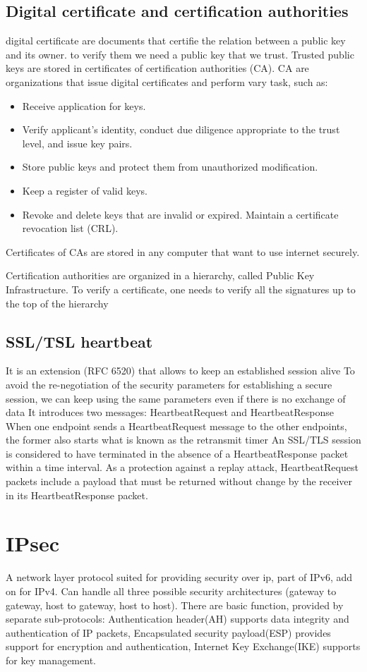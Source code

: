 \subsection{Digital certificate and certification authorities}
digital certificate are documents that certifie the relation between a public
key and its owner. to verify them we need a public key that we trust. 
Trusted public keys are stored in certificates of certification authorities (CA).
CA are organizations that issue digital certificates and perform vary task, such as:
\begin{itemize}
    \item Receive application for keys.
    \item Verify applicant’s identity, conduct due diligence appropriate to the trust level,
and issue key pairs.
    \item Store public keys and protect them from unauthorized modification.
    \item Keep a register of valid keys.
    \item Revoke and delete keys that are invalid or expired. Maintain a certificate
revocation list (CRL).

\end{itemize}
Certificates of CAs are stored in any computer that want to use internet
securely.

Certification authorities are
organized in a hierarchy, called
Public Key Infrastructure. To verify a certificate, one needs
to verify all the signatures up to
the top of the hierarchy

\subsection{SSL/TSL heartbeat}
It is an extension (RFC 6520) that allows to keep an established session
alive
To avoid the re-negotiation of the security parameters for establishing a
secure session, we can keep using the same parameters even if there is
no exchange of data
It introduces two messages: HeartbeatRequest and HeartbeatResponse
When one endpoint sends a HeartbeatRequest message to the other
endpoints, the former also starts what is known as the retransmit timer
 An SSL/TLS session is considered to have terminated in the absence of a
HeartbeatResponse packet within a time interval.
As a protection against a replay attack, HeartbeatRequest packets
include a payload that must be returned without change by the receiver
in its HeartbeatResponse packet.

\section{IPsec}
A network layer protocol suited for providing security over ip, part of IPv6, add on for IPv4. 
Can handle all three possible security architectures (gateway to gateway, host to gateway, host to host).
There are basic function, provided by separate sub-protocols: Authentication header(AH) supports data integrity and authentication of IP packets,
Encapsulated security payload(ESP) provides support for encryption and authentication, Internet Key Exchange(IKE) supports for key management.

